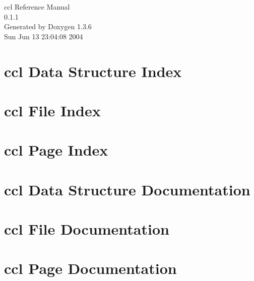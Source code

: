 \documentclass[a4paper]{book}
\begin{document}
\begin{titlepage}
\vspace*{7cm}
\begin{center}
{\Large ccl Reference Manual\\[1ex]\large 0.1.1 }\\
\vspace*{1cm}
{\large Generated by Doxygen 1.3.6}\\
\vspace*{0.5cm}
{\small Sun Jun 13 23:04:08 2004}\\
\end{center}
\end{titlepage}
\clearemptydoublepage
{}
\tableofcontents
\clearemptydoublepage
{}
\chapter{ccl Data Structure Index}

\chapter{ccl File Index}

\chapter{ccl Page Index}

\chapter{ccl Data Structure Documentation}


\chapter{ccl File Documentation}

\chapter{ccl Page Documentation}

\printindex
\end{document}
